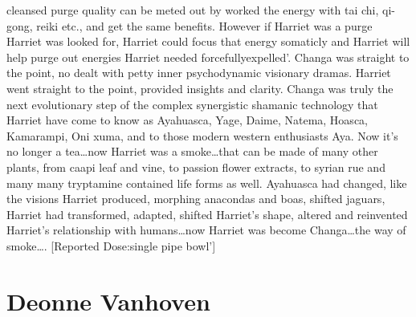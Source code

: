 \documentclass[12pt]{book}
\begin{document}
cleansed purge quality can be meted out by worked the energy with tai chi, qi-gong, reiki etc., and get the same benefits. However if Harriet was a purge Harriet was looked for, Harriet could focus that energy somaticly and Harriet will help purge out energies Harriet needed forcefullyexpelled'. Changa was straight to the point, no dealt with petty inner psychodynamic visionary dramas. Harriet went straight to the point, provided insights and clarity. Changa was truly the next evolutionary step of the complex synergistic shamanic technology that Harriet have come to know as Ayahuasca, Yage, Daime, Natema, Hoasca, Kamarampi, Oni xuma, and to those modern western enthusiasts Aya. Now it's no longer a tea\ldots now Harriet was a smoke\ldots that can be made of many other plants, from caapi leaf and vine, to passion flower extracts, to syrian rue and many many tryptamine contained life forms as well. Ayahuasca had changed, like the visions Harriet produced, morphing anacondas and boas, shifted jaguars, Harriet had transformed, adapted, shifted Harriet's shape, altered and reinvented Harriet's relationship with humans\ldots now Harriet was become Changa\ldots the way of smoke\ldots . [Reported Dose:single pipe bowl']



\chapter{Deonne Vanhoven}
\end{document}
